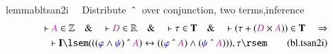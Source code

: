 \begin{restatable}{lemma}{bltsan2i}~~ Distribute $~\string^~$ over conjunction,
two terms,inference
\begin{align}
\vdash \mc{A} \in \mathbb{Z}\quad\&\quad \vdash \mc{D} \in
    \mathbb{R}\quad\&\quad \vdash \tau \in \mathbf{T}\quad\&\quad \vdash ( \tau
    + ( \mc{D} \times \mc{A} ) ) \in \mathbf{T}\quad\Rightarrow \notag \\ %
     \quad \vdash
    \mathbf{I} \lsem ( ( ( \mw{\varphi} \wedge \mw{\psi} ) ~\string^~ \mc{A} )
    \leftrightarrow ( ( \mw{\varphi} ~\string^~ \mc{A} ) \wedge ( \mw{\psi}
    ~\string^~ \mc{A} ) ) ) , \tau \rsem\label{eq:bl.tsan2i}\tag{bl.tsan2i}
\end{align}
\end{restatable}

